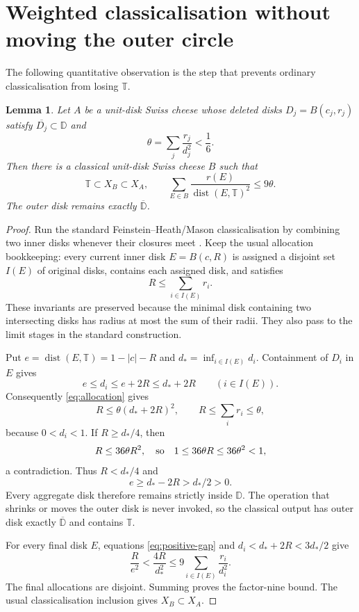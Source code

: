 \documentclass[11pt]{article}
\newtheorem{lemma}[theorem]{Lemma}
\newcommand{\D}{\mathbb D}
\newcommand{\T}{\mathbb T}
\newcommand{\cl}[1]{\overline{#1}}
\begin{document}
\section{Weighted classicalisation without moving the outer circle}

The following quantitative observation is the step that prevents ordinary
classicalisation from losing $\T$.

\begin{lemma}\label{lem:classical}
Let $A$ be a unit-disk Swiss cheese whose deleted disks
$D_j=B(c_j,r_j)$ satisfy $\cl{D_j}\subset\D$ and
\[
                \theta=\sum_j\frac{r_j}{d_j^2}<\frac16.
\]
Then there is a classical unit-disk Swiss cheese $B$ such that
\[
       \T\subset X_B\subset X_A,
       \qquad
       \sum_{E\in B}\frac{r(E)}{\operatorname{dist}(E,\T)^2}
       \leq 9\theta.
\]
The outer disk remains exactly $\cl\D$.
\end{lemma}

\begin{proof}
Run the standard Feinstein--Heath/Mason classicalisation by combining two
inner disks whenever their closures meet \cite{FMY}.  Keep the usual
allocation bookkeeping: every current inner disk $E=B(c,R)$ is assigned a
disjoint set $I(E)$ of original disks, contains each assigned disk, and
satisfies
\begin{equation}\label{eq:allocation}
                 R\leq\sum_{i\in I(E)}r_i.
\end{equation}
These invariants are preserved because the minimal disk containing two
intersecting disks has radius at most the sum of their radii.  They also pass
to the limit stages in the standard construction.

Put $e=\operatorname{dist}(E,\T)=1-|c|-R$ and
$d_* =\inf_{i\in I(E)}d_i$.  Containment of $D_i$ in $E$ gives
\[
       e\leq d_i\leq e+2R\leq d_*+2R
       \qquad(i\in I(E)).
\]
Consequently \eqref{eq:allocation} gives
\begin{equation}\label{eq:selfconsistent}
       R\leq\theta(d_*+2R)^2,
       \qquad R\leq\sum_i r_i\leq\theta,
\end{equation}
because $0<d_i<1$.  If $R\geq d_*/4$, then
\[
       R\leq36\theta R^2,
       \quad\hbox{so}\quad
       1\leq36\theta R\leq36\theta^2<1,
\]
a contradiction.  Thus $R<d_*/4$ and
\begin{equation}\label{eq:positive-gap}
               e\geq d_*-2R>d_*/2>0.
\end{equation}
Every aggregate disk therefore remains strictly inside $\D$.  The operation
that shrinks or moves the outer disk is never invoked, so the classical output
has outer disk exactly $\cl\D$ and contains $\T$.

For every final disk $E$, equations \eqref{eq:positive-gap} and
$d_i<d_*+2R<3d_*/2$ give
\[
 \frac{R}{e^2}
 <\frac{4R}{d_*^2}
 \leq 9\sum_{i\in I(E)}\frac{r_i}{d_i^2}.
\]
The final allocations are disjoint.  Summing proves the factor-nine bound.
The usual classicalisation inclusion gives $X_B\subset X_A$.
\end{proof}
\end{document}
